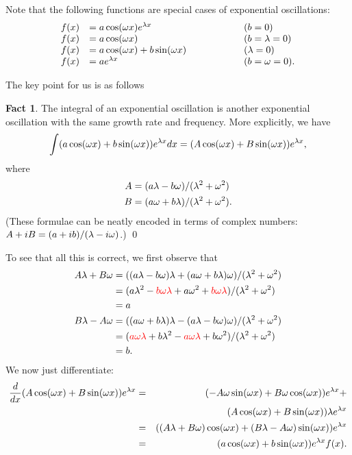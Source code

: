 \documentclass[a4paper]{book}
\theoremstyle{definition}
\newtheorem{fact}[theorem]{Fact}
\begin{document}
Note that the following functions are special cases of exponential
oscillations:
\[ \begin{array}{rlcl}
 f(x) &= a\cos(\omega x) e^{\lambda x} &\hspace{4em}& (b=0) \\
 f(x) &= a\cos(\omega x) && (b=\lambda=0) \\
 f(x) &= a\cos(\omega x) + b\sin(\omega x) && (\lambda=0) \\
 f(x) &= a e^{\lambda x} && (b=\omega=0).
\end{array} \]
 
The key point for us is as follows
\begin{fact}
 The integral of an exponential oscillation is another exponential
 oscillation with the same growth rate and frequency.
 More explicitly, we have
 \[ \int (a\cos(\omega x) + b\sin(\omega x)) e^{\lambda x} dx = 
     (A\cos(\omega x) + B\sin(\omega x)) e^{\lambda x},
 \]
 where 
 \begin{align*}
  A &= (a\lambda - b\omega)/(\lambda^2+\omega^2) \\
  B &= (a\omega + b\lambda)/(\lambda^2+\omega^2).
 \end{align*}
 (These formulae can be neatly encoded in terms of complex numbers:
 $A+iB=(a+ib)/(\lambda-i\omega)$.) \qed
\end{fact}

To see that all this is correct, we first observe that 
\begin{align*}
 A\lambda + B\omega &= ((a\lambda-b\omega)\lambda + (a\omega + b\lambda)\omega)/(\lambda^2+\omega^2) \\
             &= (a\lambda^2 - {\color{red}b\omega\lambda} + a\omega^2 + {\color{red}b\omega\lambda})/
                 (\lambda^2 + \omega^2) \\
             &= a \\
 B\lambda - A\omega &= ((a\omega + b\lambda)\lambda - (a\lambda - b\omega)\omega)/(\lambda^2+\omega^2) \\
             &= ({\color{red}a\omega\lambda} + b\lambda^2 - {\color{red}a\omega\lambda} + b\omega^2)/
                 (\lambda^2+\omega^2) \\
             &= b.
\end{align*}
We now just differentiate:
\begin{eqnarray*}
 \frac{d}{dx} (A\cos(\omega x) + B\sin(\omega x)) e^{\lambda x} 
  &=& (-A\omega\sin(\omega x) + B\omega\cos(\omega x)) e^{\lambda x} + \\
  &&  (A\cos(\omega x) + B\sin(\omega x))\lambda e^{\lambda x} \\
  &=& ((A\lambda + B\omega)\cos(\omega x) + (B\lambda - A\omega)\sin(\omega x))e^{\lambda x} \\ 
  &=& (a\cos(\omega x) + b\sin(\omega x)) e^{\lambda x}  f(x).
\end{eqnarray*}
\end{document}
